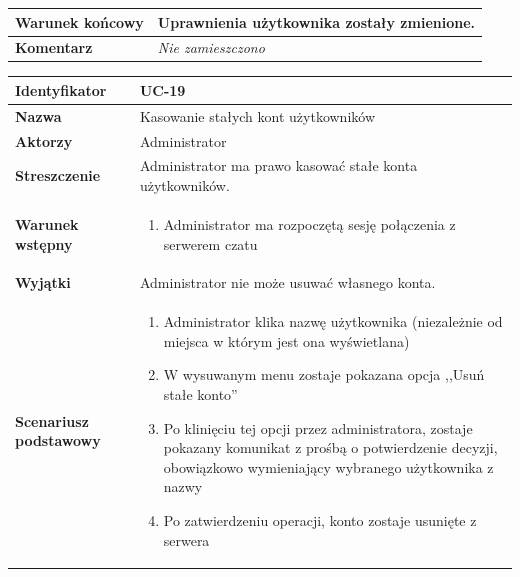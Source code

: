\documentclass[11pt,oneside,a4paper,titlepage,onecolumn]{article}
\newenvironment{enumreq}
{ \begin{enumerate}[topsep=0pt,itemsep=-1ex,partopsep=1ex,parsep=1ex] }
{ \end{enumerate}                  }
\begin{document}
{\begin{tabular}{ | l | l | }
	\hline
		\parbox[t]{4cm}{\textbf{Warunek końcowy}} & \parbox[t]{11cm}{
			Uprawnienia użytkownika zostały zmienione.
		}
		\\
		
	\hline
		\parbox[t]{4cm}{\textbf{Komentarz}} & \parbox[t]{11cm}{
			\textit{Nie zamieszczono}
		}
		\\

	\hline
\end{tabular}

\vspace{2em}

\begin{tabular}{ | l | l | }
	\hline
		\textbf{Identyfikator} & 
		UC-19
		\\
		
	\hline
		\textbf{Nazwa} & 
		Kasowanie stałych kont użytkowników
		\\
		
	\hline
		\textbf{Aktorzy} & \parbox[t]{11cm}{
			Administrator
		}\\
		 
	\hline
		\parbox[t]{4cm}{\textbf{Streszczenie}} & \parbox[t]{11cm}{
			Administrator ma prawo kasować stałe konta użytkowników.
			
		}\\
		
	\hline
		\parbox[t]{4cm}{\textbf{Warunek wstępny}} & \parbox[t]{11cm}{
			\begin{enumreq}
				\item Administrator ma rozpoczętą sesję połączenia z serwerem
				czatu
			\end{enumreq}
				
		}
		\\
		
	\hline
		\parbox[t]{4cm}{\textbf{Wyjątki}} & \parbox[t]{11cm}{
			Administrator nie może usuwać własnego konta.
			
		}
		\\

	\hline
		\parbox[t]{4cm}{\textbf{Scenariusz podstawowy}} & \parbox[t]{11cm}{
			\begin{enumreq}
				\item Administrator klika nazwę użytkownika (niezależnie od
				miejsca w którym jest ona wyświetlana)
				\item W wysuwanym menu zostaje pokazana opcja ,,Usuń stałe
				konto''
				\item Po klinięciu tej opcji przez administratora, zostaje
				pokazany komunikat z prośbą o potwierdzenie decyzji,
				obowiązkowo wymieniający wybranego użytkownika z nazwy
				\item Po zatwierdzeniu operacji, konto zostaje usunięte z
				serwera
			\end{enumreq}
		}
		\\
		

\end{tabular}}
\end{document}
